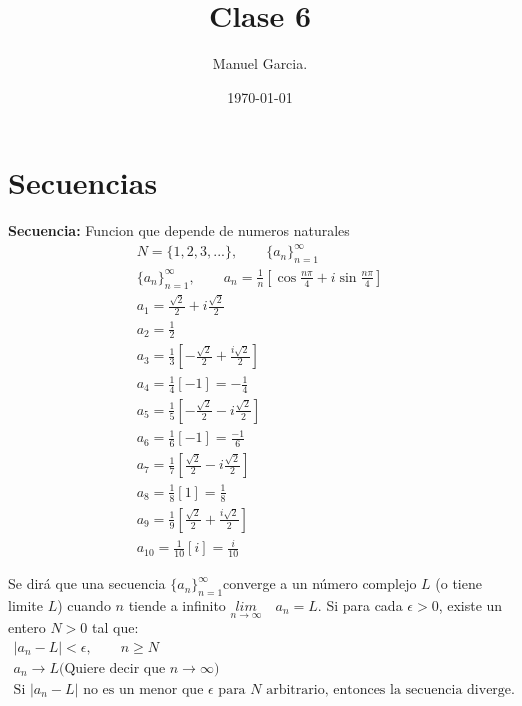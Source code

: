 \documentclass{article}
\title{Clase 6  }
\author{Manuel Garcia.}
\date{\today}
\newcommand{\caja}[3]{%
  \begin{tcolorbox}[colback=#1!5!white,colframe=#1!25!black,title=#2]
    #3
  \end{tcolorbox}%
}
\begin{document}
\maketitle

\section{Secuencias }
\textbf{Secuencia: }Funcion que depende de numeros naturales 
\begin{gather}
  N = \{1,2,3,...\}, \qquad \{a_n\}^ {\infty}_{n=1 } \\
  \{a_n\}^ {\infty}_{n=1 }, \qquad a _{n } = \frac{1}{n}\left[\cos{\frac{n \pi}{4 }} + i \sin{\frac{n \pi}{4 }}\right]\\
  a _{1 }  = \frac{\sqrt{2 } }{2 }+ i \frac{\sqrt{2 } }{2} \\
  a_2 = \frac{1}{2}\\
  a_3  = \frac{1}{3}\left[- \frac{\sqrt{2 } }{2} + \frac{i \sqrt{2} }{2}\right]\\
  a_4  = \frac{1}{4}\left[-1 \right] = -\frac{1}{4}\\
  a _{5 }  = \frac{1}{5}\left[- \frac{\sqrt{2} }{2}- i \frac{\sqrt{2 } }{2}\right]\\
  a_6  = \frac{1}{6}\left[-1 \right] = \frac{-1 }{6 }\\
  a_7 = \frac{1}{7}\left[\frac{\sqrt{2 } }{2}- i \frac{\sqrt{2 } }{2}\right]\\
  a_8 = \frac{1}{8}\left[1 \right] = \frac{1}{8}\\
  a_9 = \frac{1}{9}\left[\frac{\sqrt{2} }{2} + \frac{i \sqrt{2 } }{2}\right]\\
  a_{10} = \frac{1}{10 }\left[i \right] = \frac{i }{10 }
\end{gather}

\caja{green}{Convergencia o divergencia}{
  Se dirá que una secuencia $ \{a_n\}_{n=1}^\infty  $converge a un número complejo $L$ (o tiene limite $L$) cuando $n$ tiende a infinito $ \underset{n \rightarrow \infty}{lim }\quad a_n = L  $. Si para cada $ \epsilon  > 0  $, existe un entero $ N>0  $ tal que: 
  \begin{gather}
    \left|a_n-L \right| < \epsilon, \qquad n \geq N \\
    a_n \rightarrow L \text{(Quiere decir que }n \rightarrow \infty)\\
    \text{Si }|a_n -L|\text{ no es un menor que } \epsilon \text{ para } N \text{ arbitrario, entonces la secuencia diverge.}
  \end{gather}
}
\end{document}
